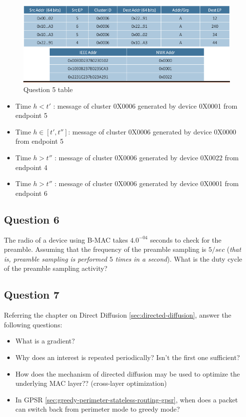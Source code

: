 \begin{figure}[h]
	\centering\includegraphics[scale=0.50]{images/Pasted image 20230601094724.png}
	\caption{Question 5 table}
	\label{q5-schema}
\end{figure}


\begin{itemize}
	\item Time $h<t'$ : message of cluster 0X0006 generated by device 0X0001 from endpoint 5
	\item 
	Time $h \in [t', t'']$: message of cluster 0X0006 generated by device 0X0000 from endpoint 5
	\item
	Time $h>t''$ : message of cluster 0X0006 generated by device 0X0022 from endpoint 4
	\item
	Time $h>t''$ : message of cluster 0X0006 generated by device 0X0001 from endpoint 6
\end{itemize}

\subsection{Question 6}
The radio of a device using B-MAC takes $4.0^{-04}$ seconds to check for the preamble. Assuming that the frequency of the preamble sampling is $5/sec$ (\textit{that is, preamble sampling is performed $5$ times in a second}). What is the duty cycle of the preamble sampling activity?

\subsection{Question 7}
Referring the chapter on Direct Diffusion \ref{sec:directed-diffusion}, answer the following questions:
\begin{itemize}
	\item What is a gradient?
	\item Why does an interest is repeated  periodically? Isn’t the first one sufficient?
	\item How does the mechanism of directed diffusion may be used to
	optimize the underlying MAC layer?? (cross-layer optimization)
	\item In GPSR \ref{sec:greedy-perimeter-stateless-routing-gpsr}, when does a packet can switch back from
	perimeter mode to greedy mode?
\end{itemize}



